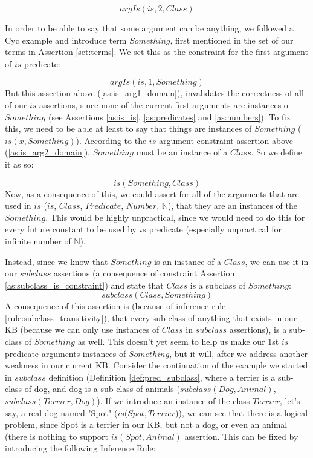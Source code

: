 \begin{equation}\label{as:is_arg2_domain}
argIs(is,2, Class)
\end{equation}

In order to be able to say that some argument can be anything, we followed a 
Cyc example and introduce term $Something$, first mentioned in the set of our 
terms in Assertion \ref{set:terms}. We set this as the constraint for the first
argument of $is$ predicate:

\begin{equation}\label{as:is_arg1_domain}
argIs(is,1, Something)
\end{equation}
But this assertion above (\ref{as:is_arg1_domain}), invalidates the correctness
of all of our $is$ assertions, since none of the current first arguments are
instances o $Something$ (see Assertions \ref{as:is_is}, \ref{as:predicates} and 
\ref{as:numbers}). To fix this, we need to be able at least to say that things 
are instances of $Something$ ($is(x,Something)$). According to the $is$ argument
constraint assertion above (\ref{as:is_arg2_domain}), $Something$ must be an 
instance of a $Class$. So we define it as so:

\begin{equation}\label{as:is_something}
	is(Something,Class)
\end{equation}
Now, as a consequence of this, we could assert for all of the arguments that
are used in $is$ ($is$, $Class$, $Predicate$, $Number$, $\mathbb{N}$), that 
they are an instances of the $Something$. This would
be highly unpractical, since we would need to do this for every future constant
to be used by $is$ predicate (especially unpractical for infinite number of
$\mathbb{N}$).

Instead, since we know that $Something$ is an instance of a $Class$, we can use 
it in our $subclass$ assertions (a consequence of constraint Assertion 
\ref{as:subclass_is_constraint}) and state that $Class$ is a subclass of 
$Something$:
\begin{equation}\label{as:subclass_something}
	subclass(Class, Something)
\end{equation}
A consequence of this assertion is (because of inference rule 
\ref{rule:subclass_transitivity}), that
every sub-class of anything that exists in our KB (because we can only use 
instances of $Class$ in $subclass$ assertions), is a sub-class of $Something$ as
well. This doesn't yet seem to help us make our 1st $is$ predicate arguments 
instances of $Something$, but it will, after we address another weakness in our
current KB. 
Consider the continuation of the example we started in $subclass$ 
definition (Definition \ref{def:pred_subclass}, where a terrier is a sub-class
of dog, and dog is a sub-class of animals ($subclass(Dog,Animal)$, 
$subclass(Terrier,Dog)$). If we introduce an instance of the
class $Terrier$, let's say, a real dog named "Spot" ($is(Spot,Terrier$)), we can
see that there is a logical problem, since Spot is a terrier in our KB, but
not a dog, or even an animal (there is nothing to support $is(Spot,Animal)$ 
assertion. This can be fixed by introducing the following Inference Rule:

